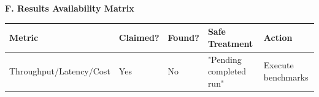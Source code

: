 \documentclass[12pt]{article}
\begin{document}
\vspace{2em}
\noindent\textbf{F. Results Availability Matrix} \\
\begin{tabularx}{\textwidth}{|l|l|l|X|X|}
\hline
\textbf{Metric} & \textbf{Claimed?} & \textbf{Found?} & \textbf{Safe Treatment} & \textbf{Action} \\ \hline
Throughput/Latency/Cost & Yes & No & "Pending completed run" & Execute benchmarks \\ \hline
\end{tabularx}
\end{document}
